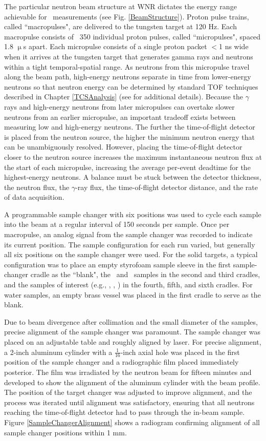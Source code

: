The particular neutron beam structure at WNR dictates the energy range
achievable for \tot\ measurements (see Fig. \ref{BeamStructure}).
Proton pulse trains, called ``macropulses", are delivered to the tungsten target at 120 Hz.
Each macropulse consists of ~350 individual proton pulses, called ``micropulses", spaced 1.8 
$\upmu$s apart. Each micropulse consists of a single proton packet $<$1 ns wide when it 
arrives at the tungsten target that generates gamma rays and neutrons within a tight
temporal-spatial range. As neutrons from this micropulse travel along the beam path, 
high-energy neutrons separate in time from lower-energy neutrons so that neutron
energy can be determined by standard TOF techniques described in Chapter
\ref{TCSAnalysis} (see \cite{Moore1980} for additional details).
Because the $\gamma$ rays and high-energy neutrons from later micropulses can
overtake slower neutrons from an earlier micropulse, an important tradeoff
exists between measuring low and high-energy neutrons. The further the time-of-flight
detector is placed from the neutron source, the higher the minimum neutron energy that can be 
unambiguously resolved. However, placing the time-of-flight detector closer to the neutron source
increases the maximum instantaneous neutron flux at the start of each
micropulse, increasing the average per-event deadtime for the highest-energy
neutrons. A balance must be stuck between the detector thickness, the neutron
flux, the $\gamma$-ray flux, the time-of-flight detector distance, and the rate
of data acquisition.

A programmable sample changer with six positions
was used to cycle each sample into the beam at a regular interval of 150 seconds 
per sample. Once per macropulse, an analog signal from the sample changer was recorded to 
indicate its current position. The sample configuration for each run varied, but
generally all six positions on the sample changer were used. For the solid targets,
a typical configuration was to place an empty styrofoam sample sleeve in the
first sample-changer cradle as
the ``blank", the \cNat\ and \pbNat\ samples in the second and third
cradles, and the samples of interest (e.g., \niEight, \niNat, \niFour) in
the fourth, fifth, and sixth cradles. For water samples, an empty brass vessel
was placed in the first cradle to serve as the blank.

Due to beam divergence after collimation and the small diameter of the
samples, precise alignment of the sample changer was paramount. The sample
changer was placed on an adjustable table and roughly aligned by laser. For
precise alignment, a 2-inch aluminum cylinder with a
$\frac{1}{16}$-inch axial hole was placed
in the first position of the sample changer and a radiographic film placed
immediately posterior. The film was irradiated by the neutron beam for fifteen 
minutes and developed to show the alignment of the aluminum cylinder with the
beam profile. The position of the target changer was adjusted to improve alignment,
and the process was
iterated until alignment was satisfactory, ensuring that all neutrons
reaching the time-of-flight detector had to pass through the in-beam sample.
Figure \ref{SampleChangerAlignment} shows a radiogram confirming alignment of all
sample changer positions within 1 mm.

